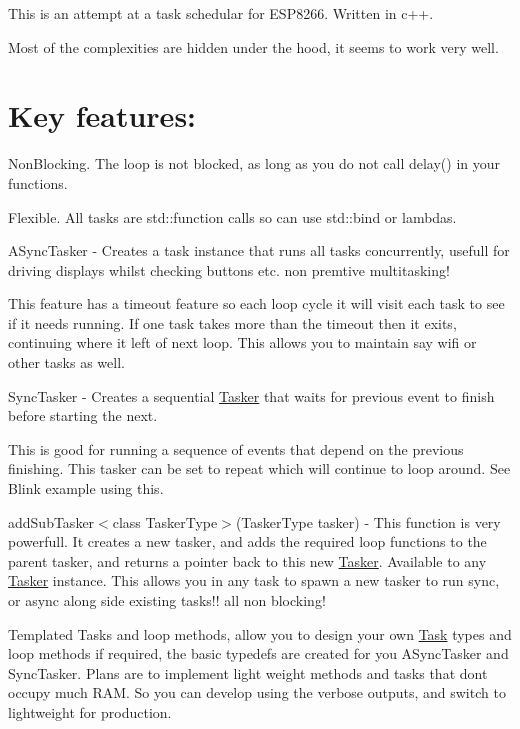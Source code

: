 This is an attempt at a task schedular for E\+S\+P8266. Written in c++.

Most of the complexities are hidden under the hood, it seems to work very well.

\section*{Key features\+:}


\begin{DoxyItemize}
\item Non\+Blocking. The loop is not blocked, as long as you do not call delay() in your functions.
\item Flexible. All tasks are std\+::function calls so can use std\+::bind or lambdas.
\item A\+Sync\+Tasker -\/ Creates a task instance that runs all tasks concurrently, usefull for driving displays whilst checking buttons etc. non premtive multitasking!
\begin{DoxyItemize}
\item This feature has a timeout feature so each loop cycle it will visit each task to see if it needs running. If one task takes more than the timeout then it exits, continuing where it left of next loop. This allows you to maintain say wifi or other tasks as well.
\end{DoxyItemize}
\item Sync\+Tasker -\/ Creates a sequential \hyperlink{class_tasker}{Tasker} that waits for previous event to finish before starting the next.
\begin{DoxyItemize}
\item This is good for running a sequence of events that depend on the previous finishing. This tasker can be set to repeat which will continue to loop around. See Blink example using this.
\end{DoxyItemize}
\item add\+Sub\+Tasker$<$class Tasker\+Type$>$(\+Tasker\+Type tasker) -\/ This function is very powerfull. It creates a new tasker, and adds the required loop functions to the parent tasker, and returns a pointer back to this new \hyperlink{class_tasker}{Tasker}. Available to any \hyperlink{class_tasker}{Tasker} instance. This allows you in any task to spawn a new tasker to run sync, or async along side existing tasks!! all non blocking!
\item Templated Tasks and loop methods, allow you to design your own \hyperlink{class_task}{Task} types and loop methods if required, the basic typedefs are created for you {\ttfamily A\+Sync\+Tasker} and {\ttfamily Sync\+Tasker}. Plans are to implement light weight methods and tasks that don\textquotesingle{}t occupy much R\+AM. So you can develop using the verbose outputs, and switch to lightweight for production.
\end{DoxyItemize}

